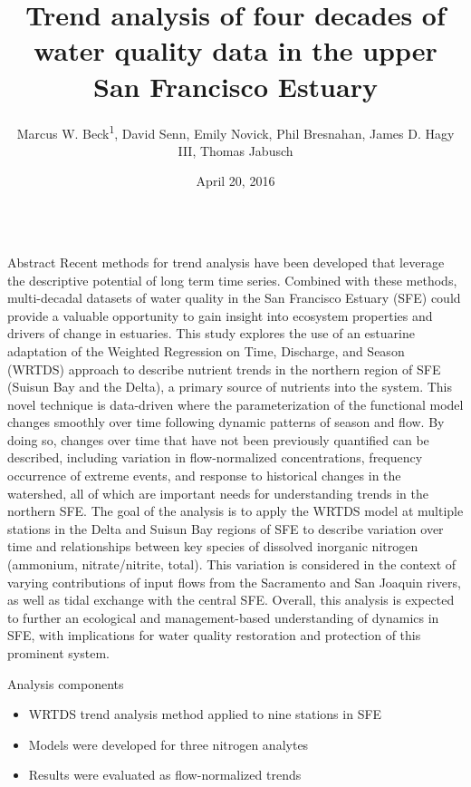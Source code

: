 \documentclass[final,t,serif]{beamer}\usepackage[]{graphicx}\usepackage[]{color}
\title{\LARGE Trend analysis of four decades of water quality data in the upper San Francisco Estuary}
\author[Beck et al.]{Marcus W. Beck\textsuperscript{1}, David Senn, Emily Novick, Phil Bresnahan, James D. Hagy III, Thomas Jabusch}
\institute[USEPA GED]{\textsuperscript{1}US Environmental Protection Agency ORD NHEERL, Gulf Ecology Division, Gulf Breeze, FL}
\date[April 20, 2016]{April 20, 2016}
\begin{document}
\begin{frame}{}

	\vspace{-0.6cm} %
  \begin{columns}[t]
  	\hspace{0.4cm}
  	
  	\begin{column}{.31\linewidth}

      \begin{block}{Abstract}
        		\alert{\small Recent methods for trend analysis have been developed that leverage the descriptive potential of long term time series.  Combined with these methods, multi-decadal datasets of water quality in the San Francisco Estuary (SFE) could provide a valuable opportunity to gain insight into ecosystem properties and drivers of change in estuaries.  This study explores the use of an estuarine adaptation of the Weighted Regression on Time, Discharge, and Season (WRTDS) approach to describe nutrient trends in the northern region of SFE (Suisun Bay and the Delta), a primary source of nutrients into the system.  This novel technique is data-driven where the parameterization of the functional model changes smoothly over time following dynamic patterns of season and flow.  By doing so, changes over time that have not been previously quantified can be described, including variation in flow-normalized concentrations, frequency occurrence of extreme events, and response to historical changes in the watershed, all of which are important needs for understanding trends in the northern SFE.  The goal of the analysis is to apply the WRTDS model at multiple stations in the Delta and Suisun Bay regions of SFE to describe variation over time and relationships between key species of dissolved inorganic nitrogen (ammonium, nitrate/nitrite, total).  This variation is considered in the context of varying contributions of input flows from the Sacramento and San Joaquin rivers, as well as tidal exchange with the central SFE.  Overall, this analysis is expected to further an ecological and management-based understanding of dynamics in SFE, with implications for water quality restoration and protection of this prominent system.}
      \end{block}
      
      \begin{block}{Analysis components}
    	\begin{itemize}
    	\item WRTDS trend analysis method applied to \alert{nine stations} in SFE
    	\item Models were developed for three \alert{nitrogen analytes} 
    	\item Results were evaluated as \alert{flow-normalized trends}
    	\end{itemize}
    	

\end{block}
\end{column}
\end{columns}
\end{frame}
\end{document}
